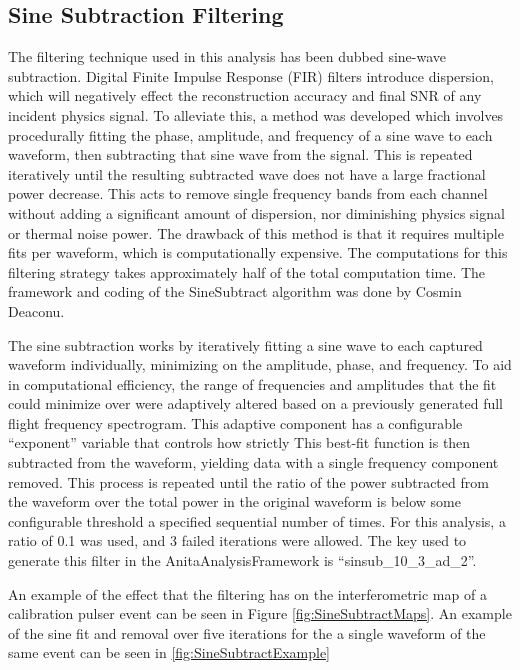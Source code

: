 	\subsection{Sine Subtraction Filtering}
		The filtering technique used in this analysis has been dubbed sine-wave subtraction.  Digital Finite Impulse Response (FIR) filters introduce dispersion, which will negatively effect the reconstruction accuracy and final SNR of any incident physics signal.  To alleviate this, a method was developed which involves procedurally fitting the phase, amplitude, and frequency of a sine wave to each waveform, then subtracting that sine wave from the signal.  This is repeated iteratively until the resulting subtracted wave does not have a large fractional power decrease.  This acts to remove single frequency bands from each channel without adding a significant amount of dispersion, nor diminishing physics signal or thermal noise power.  The drawback of this method is that it requires multiple fits per waveform, which is computationally expensive.  The computations for this filtering strategy takes approximately half of the total computation time.  The framework and coding of the SineSubtract algorithm was done by Cosmin Deaconu.  

	The sine subtraction works by iteratively fitting a sine wave to each captured waveform individually, minimizing on the amplitude, phase, and frequency.   To aid in computational efficiency, the range of frequencies and amplitudes that the fit could minimize over were adaptively altered based on a previously generated full flight frequency spectrogram.  This adaptive component has a configurable ``exponent'' variable that controls how strictly   This best-fit function is then subtracted from the waveform, yielding data with a single frequency component removed.  This process is repeated until the ratio of the power subtracted from the waveform over the total power in the original waveform is below some configurable threshold a specified sequential number of times.  For this analysis, a ratio of 0.1 was used, and 3 failed iterations were allowed.  The key used to generate this filter in the AnitaAnalysisFramework is ``sinsub\_10\_3\_ad\_2''.  
	
	An example of the effect that the filtering has on the interferometric map of a calibration pulser event can be seen in Figure \ref{fig:SineSubtractMaps}.  An example of the sine fit and removal over five iterations for the a single waveform of the same event can be seen in \ref{fig:SineSubtractExample} 
	
